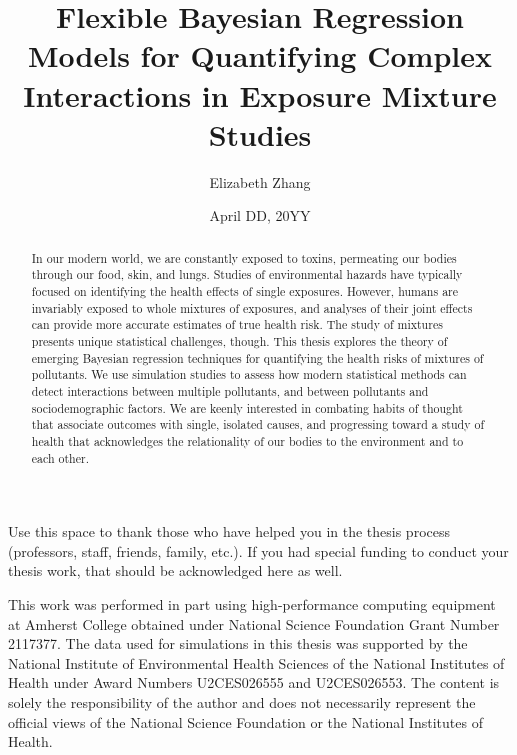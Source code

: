 \documentclass[12pt, twoside]{amherstthesis}
\title{Flexible Bayesian Regression Models for Quantifying Complex Interactions in Exposure Mixture Studies}
\author{Elizabeth Zhang}
\date{April DD, 20YY}
\begin{document}
\doublespace
  \maketitle

\frontmatter %
\pagestyle{fancyplain}

  \begin{abstract}
    In our modern world, we are constantly exposed to toxins, permeating our bodies through our food, skin, and lungs. Studies of environmental hazards have typically focused on identifying the health effects of single exposures. However, humans are invariably exposed to whole mixtures of exposures, and analyses of their joint effects can provide more accurate estimates of true health risk. The study of mixtures presents unique statistical challenges, though. This thesis explores the theory of emerging Bayesian regression techniques for quantifying the health risks of mixtures of pollutants. We use simulation studies to assess how modern statistical methods can detect interactions between multiple pollutants, and between pollutants and sociodemographic factors. We are keenly interested in combating habits of thought that associate outcomes with single, isolated causes, and progressing toward a study of health that acknowledges the relationality of our bodies to the environment and to each other.
  \end{abstract}
  \begin{acknowledgments}
    Use this space to thank those who have helped you in the thesis process (professors, staff, friends, family, etc.). If you had special funding to conduct your thesis work, that should be acknowledged here as well.

    This work was performed in part using high-performance computing equipment at Amherst College obtained under National Science Foundation Grant Number 2117377. The data used for simulations in this thesis was supported by the National Institute of Environmental Health Sciences of the National Institutes of Health under Award Numbers U2CES026555 and U2CES026553. The content is solely the responsibility of the author and does not necessarily represent the official views of the National Science Foundation or the National Institutes of Health.
  \end{acknowledgments}

  \hypersetup{linkcolor=black}
  \setcounter{tocdepth}{2}
  \tableofcontents
\end{document}
